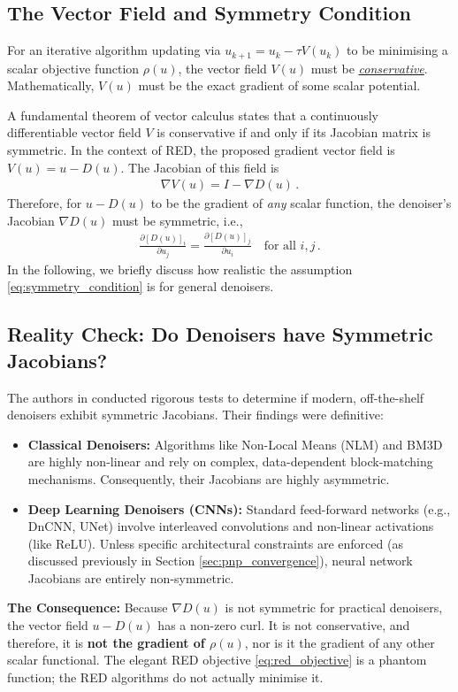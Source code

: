 \subsection{The Vector Field and Symmetry Condition}
For an iterative algorithm updating via $u_{k+1} = u_k - \tau V(u_k)$ to be minimising a scalar objective function $\rho(u)$, the vector field $V(u)$ must be \href{https://en.wikipedia.org/wiki/Conservative_vector_field}{\emph{conservative}}. Mathematically, $V(u)$ must be the exact gradient of some scalar potential. 

A fundamental theorem of vector calculus states that a continuously differentiable vector field $V$ is conservative if and only if its Jacobian matrix is symmetric. In the context of RED, the proposed gradient vector field is $V(u) = u - D(u)$. The Jacobian of this field is
\begin{align*}
    \nabla V(u) = I - \nabla D(u) \, .
\end{align*}
Therefore, for $u - D(u)$ to be the gradient of \emph{any} scalar function, the denoiser's Jacobian $\nabla D(u)$ must be symmetric, i.e.,
\begin{align}
    \frac{\partial [D(u)]_i}{\partial u_j} = \frac{\partial [D(u)]_j}{\partial u_i} \quad \text{for all } i, j \, .
    \label{eq:symmetry_condition}
\end{align}
In the following, we briefly discuss how realistic the assumption \eqref{eq:symmetry_condition} is for general denoisers.

\subsection{Reality Check: Do Denoisers have Symmetric Jacobians?}
The authors in \cite{reehorst2018regularization} conducted rigorous tests to determine if modern, off-the-shelf denoisers exhibit symmetric Jacobians. Their findings were definitive:
\begin{itemize}
    \item \textbf{Classical Denoisers:} Algorithms like Non-Local Means (NLM) and BM3D are highly non-linear and rely on complex, data-dependent block-matching mechanisms. Consequently, their Jacobians are highly asymmetric.
    \item \textbf{Deep Learning Denoisers (CNNs):} Standard feed-forward networks (e.g., DnCNN, UNet) involve interleaved convolutions and non-linear activations (like ReLU). Unless specific architectural constraints are enforced (as discussed previously in Section \ref{sec:pnp_convergence}), neural network Jacobians are entirely non-symmetric.
\end{itemize}
\textbf{The Consequence:} Because $\nabla D(u)$ is not symmetric for practical denoisers, the vector field $u - D(u)$ has a non-zero curl. It is not conservative, and therefore, it is \textbf{not the gradient of $\rho(u)$}, nor is it the gradient of any other scalar functional. The elegant RED objective \eqref{eq:red_objective} is a phantom function; the RED algorithms do not actually minimise it.

